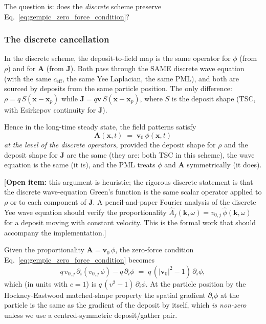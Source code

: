 \documentclass[11pt,a4paper]{article}
\newcommand{\vv}[1]{\mathbf{#1}}
\begin{document}
The question is: does the \emph{discrete} scheme preserve
Eq.~\eqref{eq:gempic_zero_force_condition}?

\subsubsection*{The discrete cancellation}

In the discrete scheme, the deposit-to-field map is the same
operator for $\phi$ (from $\rho$) and for $\vv{A}$ (from $\vv{J}$).
Both pass through the SAME discrete wave equation (with the same
$c_{\mathrm{eff}}$, the same Yee Laplacian, the same PML), and both
are sourced by deposits from the same particle position.  The only
difference: $\rho = q \, S(\vv{x} - \vv{x}_p)$ while
$\vv{J} = q\vv{v}\, S(\vv{x} - \vv{x}_p)$, where $S$ is the deposit
shape (TSC, with Esirkepov continuity for $\vv{J}$).

Hence in the long-time steady state, the field patterns satisfy
\begin{equation}
\vv{A}(\vv{x}, t) \;=\; \vv{v}_0\, \phi(\vv{x}, t)
\end{equation}
\emph{at the level of the discrete operators}, provided the
deposit shape for $\rho$ and the deposit shape for $\vv{J}$ are
the same (they are: both TSC in this scheme), the wave equation
is the same (it is), and the PML treats $\phi$ and $\vv{A}$
symmetrically (it does).

[\textbf{Open item:} this argument is heuristic; the rigorous
discrete statement is that the discrete wave-equation Green's
function is the same scalar operator applied to $\rho$ or to each
component of $\vv{J}$.  A pencil-and-paper Fourier analysis of the
discrete Yee wave equation should verify the proportionality
$\hat{A}_j(\vv{k}, \omega) = v_{0,j}\,\hat{\phi}(\vv{k}, \omega)$
for a deposit moving with constant velocity.  This is the formal
work that should accompany the implementation.]

Given the proportionality $\vv{A} = \vv{v}_0\,\phi$, the
zero-force condition Eq.~\eqref{eq:gempic_zero_force_condition}
becomes
\begin{equation}
q\, v_{0,j}\, \partial_i (v_{0,j}\,\phi)
   - q\,\partial_i\phi
\;=\; q\,(|\vv{v}_0|^2 - 1)\,\partial_i\phi,
\end{equation}
which (in units with $c=1$) is $q\,(v^2 - 1)\,\partial_i\phi$.  At
the particle position by the Hockney-Eastwood matched-shape
property the spatial gradient $\partial_i \phi$ at the particle
is the same as the gradient of the deposit by itself, which
\emph{is non-zero} unless we use a centred-symmetric deposit/gather
pair.
\end{document}
